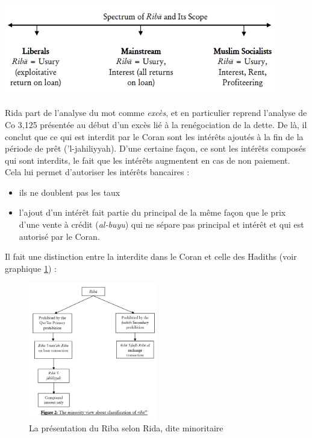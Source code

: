 \includegraphics[width=0.9\textwidth]{CourantsIslamContemporain/ImagesCourantsIslamContemporain/Riba.png}

Rida part de l'analyse du mot \riba comme \textit{excès}, et en particulier reprend l'analyse de Co 3,125 présentée au début d'un excès lié à la renégociation de la dette. De là, il conclut que ce qui est interdit par le Coran sont les intérêts ajoutés à la fin de la période de prêt (\riba ’l-jahiliyyah). D'une certaine façon, ce sont les intérêts composés qui sont interdits, le fait que les intérêts augmentent en cas de non paiement. Cela lui permet d'autoriser les intérêts bancaires :
\begin{itemize}
    \item ils ne doublent pas les taux
    \item l'ajout d'un intérêt fait partie du principal de la même façon que le prix d'une vente à crédit (\emph{\riba al-buyu}) qui ne sépare pas principal et intérêt et qui est autorisé par le Coran.
\end{itemize}
 Il fait une distinction entre la \riba interdite dans le Coran et celle des Hadiths (voir graphique \ref{fig:MinorityRiba}) :

 \begin{figure}[h!]
     \centering
      \includegraphics[width=0.5\textwidth]{CourantsIslamContemporain/ImagesCourantsIslamContemporain/RibaRida.png}
      \caption{La présentation du Riba selon Rida, dite minoritaire}
     \label{fig:MinorityRiba}
 \end{figure}
 
